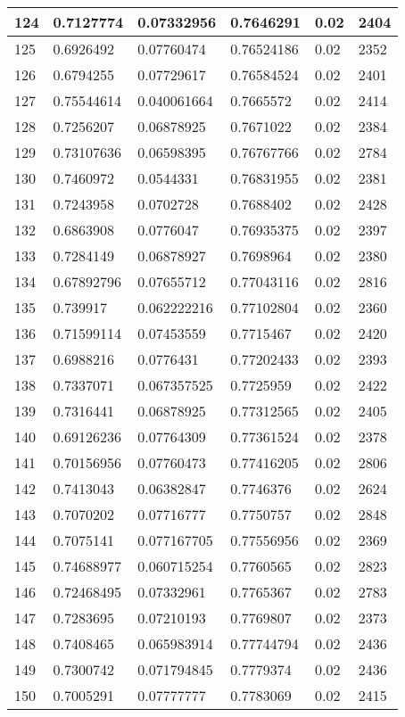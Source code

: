 \begin{longtable}{|l|l|l|l|l|l|}
124 & 0.7127774 & 0.07332956 & 0.7646291 & 0.02 & 2404 \\ \hline 
125 & 0.6926492 & 0.07760474 & 0.76524186 & 0.02 & 2352 \\ \hline 
126 & 0.6794255 & 0.07729617 & 0.76584524 & 0.02 & 2401 \\ \hline 
127 & 0.75544614 & 0.040061664 & 0.7665572 & 0.02 & 2414 \\ \hline 
128 & 0.7256207 & 0.06878925 & 0.7671022 & 0.02 & 2384 \\ \hline 
129 & 0.73107636 & 0.06598395 & 0.76767766 & 0.02 & 2784 \\ \hline 
130 & 0.7460972 & 0.0544331 & 0.76831955 & 0.02 & 2381 \\ \hline 
131 & 0.7243958 & 0.0702728 & 0.7688402 & 0.02 & 2428 \\ \hline 
132 & 0.6863908 & 0.0776047 & 0.76935375 & 0.02 & 2397 \\ \hline 
133 & 0.7284149 & 0.06878927 & 0.7698964 & 0.02 & 2380 \\ \hline 
134 & 0.67892796 & 0.07655712 & 0.77043116 & 0.02 & 2816 \\ \hline 
135 & 0.739917 & 0.062222216 & 0.77102804 & 0.02 & 2360 \\ \hline 
136 & 0.71599114 & 0.07453559 & 0.7715467 & 0.02 & 2420 \\ \hline 
137 & 0.6988216 & 0.0776431 & 0.77202433 & 0.02 & 2393 \\ \hline 
138 & 0.7337071 & 0.067357525 & 0.7725959 & 0.02 & 2422 \\ \hline 
139 & 0.7316441 & 0.06878925 & 0.77312565 & 0.02 & 2405 \\ \hline 
140 & 0.69126236 & 0.07764309 & 0.77361524 & 0.02 & 2378 \\ \hline 
141 & 0.70156956 & 0.07760473 & 0.77416205 & 0.02 & 2806 \\ \hline 
142 & 0.7413043 & 0.06382847 & 0.7746376 & 0.02 & 2624 \\ \hline 
143 & 0.7070202 & 0.07716777 & 0.7750757 & 0.02 & 2848 \\ \hline 
144 & 0.7075141 & 0.077167705 & 0.77556956 & 0.02 & 2369 \\ \hline 
145 & 0.74688977 & 0.060715254 & 0.7760565 & 0.02 & 2823 \\ \hline 
146 & 0.72468495 & 0.07332961 & 0.7765367 & 0.02 & 2783 \\ \hline 
147 & 0.7283695 & 0.07210193 & 0.7769807 & 0.02 & 2373 \\ \hline 
148 & 0.7408465 & 0.065983914 & 0.77744794 & 0.02 & 2436 \\ \hline 
149 & 0.7300742 & 0.071794845 & 0.7779374 & 0.02 & 2436 \\ \hline 
150 & 0.7005291 & 0.07777777 & 0.7783069 & 0.02 & 2415 \\ \hline 
\end{longtable}